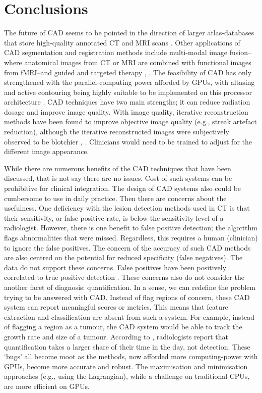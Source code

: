 \documentclass{bmcart}
\begin{document}
\section*{Conclusions}
The future of CAD seems to be pointed in the direction of larger atlas-databases that store high-quality annotated CT and MRI scans \cite{van_ginneken_computer-aided_2011}. Other applications of CAD segmentation and registration methods include multi-modal image fusion--where anatomical images from CT or MRI are combined with functional images from fMRI--and guided and targeted therapy \cite{oliveira_medical_2014}, \cite{hutton_software_2003}. The feasibility of CAD has only strengthened with the parallel-computing power afforded by GPUs, with altasing and active contouring being highly suitable to be implemented on this processor architecture \cite{smistad_medical_2015}. CAD techniques have two main strengths; it can reduce radiation dosage and improve image quality. With image quality, iterative reconstruction methods have been found to improve objective image quality (e.g., streak artefact reduction), although the iterative reconstructed images were subjectively observed to be blotchier \cite{liu_model-based_2014}, \cite{geyer_state_2015}. Clinicians would need to be trained to adjust for the different image appearance.
\par While there are numerous benefits of the CAD techniques that have been discussed, that is not say there are no issues. Cost of such systems can be prohibitive for clinical integration. The design of CAD systems also could be cumbersome to use in daily practice. Then there are concerns about the usefulness. One deficiency with the lesion detection methods used in CT is that their sensitivity, or false positive rate, is below the sensitivity level of a  radiologist. However, there is one benefit to false positive detection; the algorithm flags abnormalities that were missed. Regardless, this requires a human (clinician) to ignore the false positives. The concern of the accuracy of such CAD methods are also centred on the potential for reduced specificity (false negatives). The data do not support these concerns. False positives have been positively correlated to true positive detection \cite{van_ginneken_computer-aided_2011}. These concerns also do not consider the another facet of diagnosis: quantification. In a sense, we can redefine the problem trying to be answered with CAD. Instead of flag regions of concern, these CAD system can report meaningful scores or metrics. This means that feature extraction and classification are absent from such a system. For example, instead of flagging a region as a tumour, the CAD system would be able to track the growth rate and size of a tumour. According to \cite{van_ginneken_computer-aided_2011}, radiologists report that quantification takes a larger share of their time in the day, not detection. These `bugs' all become moot as the methods, now afforded more computing-power with GPUs, become more accurate and robust. The maximisation and minimisation approaches (e.g., using the Lagrangian), while a challenge on traditional CPUs, are more efficient on GPUs.
\end{document}

